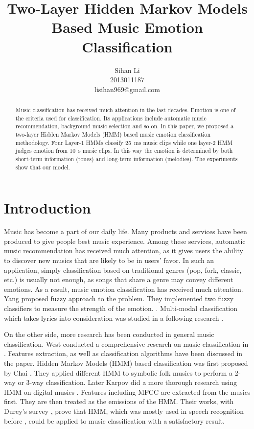 \documentclass{IEEEtran}
\title{Two-Layer Hidden Markov Models Based Music Emotion Classification}
\author{Sihan Li\\2013011187\\lisihan969@gmail.com}
\begin{document}
  \maketitle

  \begin{abstract}
    Music classification has received much attention in the last decades.
    Emotion is one of the criteria used for classification. Its applications
    include automatic music recommendation, background music selection and
    so on. In this paper, we proposed a two-layer Hidden Markov Models (HMM)
    based music emotion classification methodology. Four Layer-1 HMMs
    classify 25~ms music clips while one layer-2 HMM judges emotion from 10~s music clips.
    In this way the emotion is determined by both short-term information
    (tones) and long-term information (melodies). The experiments show that
    our model.

  \end{abstract}

  \section{Introduction}

  Music has become a part of our daily life. Many products and services have been
  produced to give people best music experience. Among these services,
  automatic music recommendation has received much attention, as it gives users
  the ability to discover new musics that are likely to be in users' favor.
  In such an application, simply classification based on traditional genres
  (pop, fork, classic, etc.) is usually not enough, as songs that share a genre may
  convey different emotions. As a result, music emotion classification has
  received much attention. Yang proposed fuzzy approach to the problem. They
  implemented two fuzzy classifiers to measure the strength of the emotion.
  \cite{yang2006music}. Multi-modal classification which takes lyrics into
  consideration was studied in a following research \cite{yang2008toward}.

  On the other side, more research has been conducted in general music
  classification. West conducted a comprehensive research on music
  classification in \cite{west2008novel}. Features extraction, as well as
  classification algorithms have been discussed in the paper. Hidden Markov
  Models (HMM) based classification was first proposed by Chai
  \cite{chai2001folk}. They applied different HMM to symbolic folk musics to
  perform a 2-way or 3-way classification. Later Karpov did a more thorough
  research using HMM on digital musics \cite{karpov2002hidden}. Features
  including MFCC are extracted from the musics first. They are then treated
  as the emissions of the HMM. Their works, with Durey's survey
  \cite{durey2001melody}, prove that HMM, which was mostly used in speech
  recognition before \cite{rabiner1989tutorial}, could be applied to music
  classification with a satisfactory result.
\end{document}
